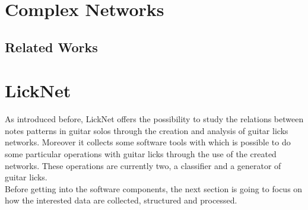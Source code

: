 \documentclass{llncs}
\begin{document}
\section{Complex Networks}
\subsection{Related Works}

\section{LickNet}
As introduced before, LickNet offers the possibility to study the
relations between notes patterns in guitar solos through the creation
and analysis of guitar licks networks. Moreover it collects
some software tools with which is possible to do some particular
operations with guitar licks through the use of the created networks.
These operations are currently two, a classifier and a generator of
guitar licks.\\
Before getting into the software components, the next section is going
to focus on how the interested data are collected, structured and processed. 
\end{document}
